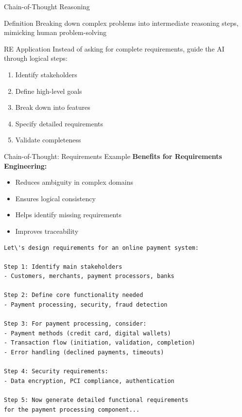 \documentclass{beamer}
\begin{document}
\begin{frame}[t]{Chain-of-Thought Reasoning}
    \begin{block}{Definition}
        Breaking down complex problems into intermediate reasoning steps, mimicking human problem-solving
    \end{block}
    
    \begin{exampleblock}{RE Application}
        Instead of asking for complete requirements, guide the AI through logical steps:
        \scriptsize
        \begin{enumerate}
            \item Identify stakeholders
            \item Define high-level goals
            \item Break down into features
            \item Specify detailed requirements
            \item Validate completeness
        \end{enumerate}
    \end{exampleblock}
    
\end{frame}

\begin{frame}[t, fragile]{Chain-of-Thought: Requirements Example}
    \textbf{Benefits for Requirements Engineering:}
    \scriptsize
    \begin{itemize}
        \item Reduces ambiguity in complex domains
        \item Ensures logical consistency
        \item Helps identify missing requirements
        \item Improves traceability
    \end{itemize}
    \begin{lstlisting}[style=code, caption={Chain-of-Thought for Payment System}]
Let\'s design requirements for an online payment system:

Step 1: Identify main stakeholders
- Customers, merchants, payment processors, banks

Step 2: Define core functionality needed
- Payment processing, security, fraud detection

Step 3: For payment processing, consider:
- Payment methods (credit card, digital wallets)
- Transaction flow (initiation, validation, completion)
- Error handling (declined payments, timeouts)

Step 4: Security requirements:
- Data encryption, PCI compliance, authentication

Step 5: Now generate detailed functional requirements 
for the payment processing component...
    \end{lstlisting}
\end{frame}
\end{document}
